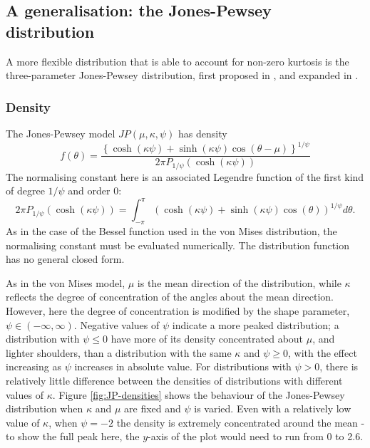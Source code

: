 \documentclass[../../ArchStats.tex]{subfiles}
\begin{document}


\subsection{A generalisation: the Jones-Pewsey distribution}
\label{sec:Jones-Pewsey}
A more flexible distribution that is able to account for non-zero kurtosis is the three-parameter Jones-Pewsey distribution, first proposed in \cite{Jones2005}, and expanded in \cite{Pewsey 2014}.

\subsubsection{Density}
The Jones-Pewsey model $JP(\mu, \kappa, \psi)$ has density
	\begin{equation}
	f(\theta) = \frac{\left\lbrace \cosh(\kappa\psi) + \sinh(\kappa\psi) \cos(\theta - \mu) \right\rbrace ^ {1/\psi}}{2\pi P_{1/\psi}(\cosh(\kappa\psi))}
	\end{equation}
The normalising constant here is an associated Legendre function of the first kind of degree $1/\psi$ and order 0:
	\begin{equation}
	2\pi P_{1/\psi}(\cosh(\kappa\psi)) = \int_{-\pi}^\pi \left( \cosh(\kappa \psi) + \sinh(\kappa\psi)\cos(\theta)\right)^{1/\psi}d\theta.
	\end{equation}
As in the case of the Bessel function used in the von Mises distribution, the normalising constant must be evaluated numerically. The distribution function has no general closed form.

As in the von Mises model, $\mu$ is the mean direction of the distribution, while $\kappa$ reflects the degree of concentration of the angles about the mean direction. However, here the degree of concentration is modified by the shape parameter, $\psi \in (-\infty, \infty)$. Negative values of $\psi$ indicate a more peaked distribution; a distribution with $\psi \leq 0$ have more of its density concentrated about $\mu$, and lighter shoulders, than a distribution with the same $\kappa$ and $\psi \geq 0$, with the effect increasing as $\psi$ increases in absolute value. For distributions with $\psi > 0$, there is relatively little difference between the densities of distributions with different values of $\kappa$. Figure \ref{fig:JP-densities} shows the behaviour of the Jones-Pewsey distribution when $\kappa$ and $\mu$ are fixed and $\psi$ is varied. Even with a relatively low value of $\kappa$, when $\psi = -2$ the density is extremely concentrated around the mean - to show the full peak here, the $y$-axis of the plot would need to run from 0 to 2.6.
\end{document}
